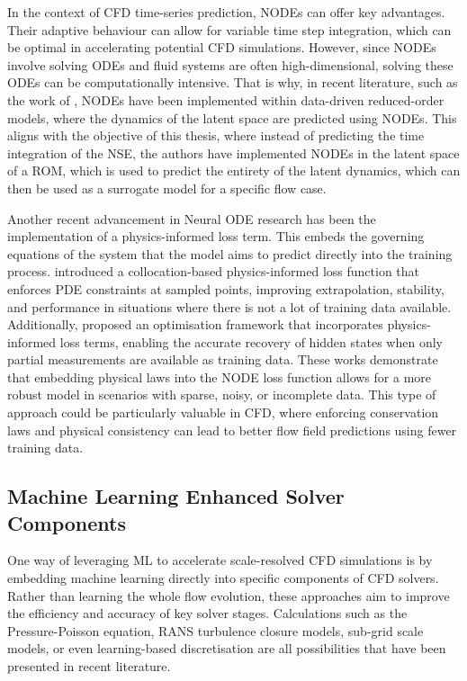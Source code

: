 In the context of CFD time-series prediction, NODEs can offer key advantages. Their adaptive behaviour can allow for variable time step integration, which can be optimal in accelerating potential CFD simulations. However, since NODEs involve solving ODEs and fluid systems are often high-dimensional, solving these ODEs can be computationally intensive. That is why, in recent literature, such as the work of \textcite{Shankar2022}, NODEs have been implemented within data-driven reduced-order models, where the dynamics of the latent space are predicted using NODEs. This aligns with the objective of this thesis, where instead of predicting the time integration of the NSE, the authors have implemented NODEs in the latent space of a ROM, which is used to predict the entirety of the latent dynamics, which can then be used as a surrogate model for a specific flow case. 

Another recent advancement in Neural ODE research has been the implementation of a physics-informed loss term. This embeds the governing equations of the system that the model aims to predict directly into the training process. \textcite{Sholokhov2023} introduced a collocation-based physics-informed loss function that enforces PDE constraints at sampled points, improving extrapolation, stability, and performance in situations where there is not a lot of training data available. Additionally, \textcite{Ghanem2025} proposed an optimisation framework that incorporates physics-informed loss terms, enabling the accurate recovery of hidden states when only partial measurements are available as training data. These works demonstrate that embedding physical laws into the NODE loss function allows for a more robust model in scenarios with sparse, noisy, or incomplete data. This type of approach could be particularly valuable in CFD, where enforcing conservation laws and physical consistency can lead to better flow field predictions using fewer training data. 

 
\subsection{Machine Learning Enhanced Solver Components}
\label{subsection: ML solver}

One way of leveraging ML to accelerate scale-resolved CFD simulations is by embedding machine learning directly into specific components of CFD solvers. Rather than learning the whole flow evolution, these approaches aim to improve the efficiency and accuracy of key solver stages. Calculations such as the Pressure-Poisson equation, RANS turbulence closure models, sub-grid scale models, or even learning-based discretisation are all possibilities that have been presented in recent literature. 

